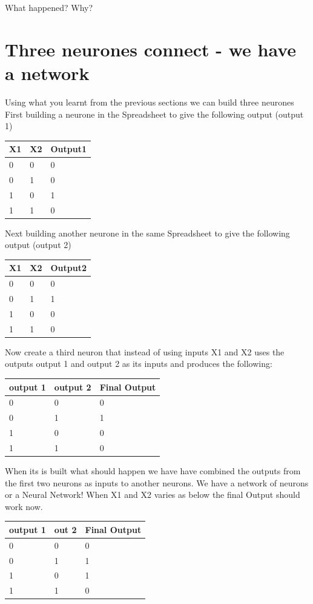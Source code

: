 What happened? Why?

\section{Three neurones connect - we have a network}
Using what you learnt from the previous sections we can build three neurones
\newline
First building a neurone in the Spreadsheet to give the following output (output 1)
\begin{tabular}{lll} \hline
X1 & X2 & Output1	 	 \\ \hline
0  & 0  & 0 \\ \hline
0  & 1	& 0 \\ \hline  
1  & 0	& 1 \\ \hline
1  & 1	& 0 \\ \hline
\end{tabular}
\newline
Next building another neurone in the same Spreadsheet to give the following output (output 2)
\begin{tabular}{lll} \hline
X1 & X2 & Output2	 	 \\ \hline
0  & 0  & 0 \\ \hline
0  & 1	& 1 \\ \hline  
1  & 0	& 0 \\ \hline
1  & 1	& 0 \\ \hline
\end{tabular}

Now create a third neuron that instead of using inputs X1 and X2 uses the outputs output 1 and output 2 as its inputs and produces the following:
\begin{tabular}{lll} \hline
output 1 & output 2 & Final Output	 	 \\ \hline
0  & 0  & 0 \\ \hline
0  & 1	& 1 \\ \hline  
1  & 0	& 0 \\ \hline
1  & 1	& 0 \\ \hline
\end{tabular}
When its is built what should happen we have have combined the outputs from the first two neurons as inputs to another neurons. We have a network of neurons or a Neural Network!
\newline 
When X1 and X2 varies as below the final Output should work now.
\begin{tabular}{lll} \hline
output 1 & out 2 & Final Output	 	 \\ \hline
0  & 0  & 0 \\ \hline
0  & 1	& 1 \\ \hline  
1  & 0	& 1 \\ \hline
1  & 1	& 0 \\ \hline
\end{tabular}
